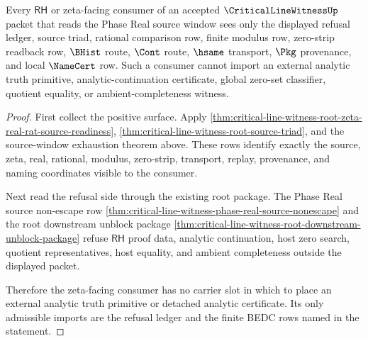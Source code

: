 \begin{theorem}
\label{thm:critical-line-witness-zeta-refusal-consumer-scope}
Every $\mathsf{RH}$ or zeta-facing consumer of an accepted $\CriticalLineWitnessUp$ packet that reads the Phase Real source window sees only the displayed refusal ledger, source triad, rational comparison row, finite modulus row, zero-strip readback row, $\BHist$ route, $\Cont$ route, $\hsame$ transport, $\Pkg$ provenance, and local $\NameCert$ row. Such a consumer cannot import an external analytic truth primitive, analytic-continuation certificate, global zero-set classifier, quotient equality, or ambient-completeness witness.
\end{theorem}
\begin{proof}
First collect the positive surface. Apply \autoref{thm:critical-line-witness-root-zeta-real-rat-source-readiness}, \autoref{thm:critical-line-witness-root-source-triad}, and the source-window exhaustion theorem above. These rows identify exactly the source, zeta, real, rational, modulus, zero-strip, transport, replay, provenance, and naming coordinates visible to the consumer.

Next read the refusal side through the existing root package. The Phase Real source non-escape row \autoref{thm:critical-line-witness-phase-real-source-nonescape} and the root downstream unblock package \autoref{thm:critical-line-witness-root-downstream-unblock-package} refuse $\mathsf{RH}$ proof data, analytic continuation, host zero search, quotient representatives, host equality, and ambient completeness outside the displayed packet.

Therefore the zeta-facing consumer has no carrier slot in which to place an external analytic truth primitive or detached analytic certificate. Its only admissible imports are the refusal ledger and the finite BEDC rows named in the statement.
\end{proof}
